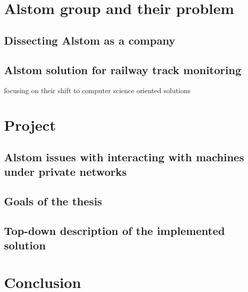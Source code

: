 \documentclass[a4paper, 12pt]{book}
\begin{document}
\chapter{Alstom group and their problem}

\section{Dissecting Alstom as a company}
\section{Alstom solution for railway track monitoring}
focusing on their shift to computer science oriented solutions

\chapter{Project}

\section{Alstom issues with interacting with machines under private networks}
\section{Goals of the thesis}
\section{Top-down description of the implemented solution}

\chapter{Conclusion}


\end{document}
